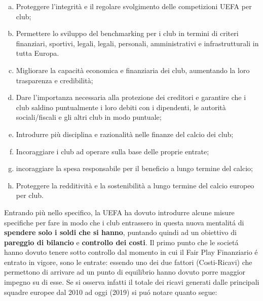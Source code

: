 \documentclass[
    corpo=12pt,
    oneside,
    evenboxes,
    tipotesi=triennale,
    stile=classica,
    oldstyle,
    autoretitolo,
    greek,
]{toptesi}
\begin{document}
\begin{interlinea}{1.5}
\begin{enumerate}[(a)]
    \item Proteggere l'integrità e il regolare svolgimento delle competizioni UEFA per club;
    \item Permettere lo sviluppo del benchmarking per i club in termini di criteri finanziari, sportivi, legali,
    legali, personali, amministrativi e infrastrutturali in tutta Europa.
    \item Migliorare la capacità economica e finanziaria dei club, aumentando la loro
    trasparenza e credibilità;
    \item Dare l'importanza necessaria alla protezione dei creditori e garantire
    che i club saldino puntualmente i loro debiti con i dipendenti, le autorità sociali/fiscali e gli altri
    club in modo puntuale;
    \item Introdurre più disciplina e razionalità nelle finanze del calcio dei club;
    \item Incoraggiare i club ad operare sulla base delle proprie entrate;
    \item incoraggiare la spesa responsabile per il beneficio a lungo termine del calcio;
    \item Proteggere la redditività e la sostenibilità a lungo termine del calcio europeo per club.
\end{enumerate}
Entrando più nello specifico, la UEFA ha dovuto introdurre alcune misure specifiche per fare in modo che i club entrassero in questa nuova 
mentalit\'a di \textbf{spendere solo i soldi che si hanno}, puntando quindi ad un obiettivo di \textbf{pareggio di bilancio} e \textbf{
controllo dei costi}. Il primo punto che le societ\'a hanno dovuto tenere sotto controllo dal momento in cui il Fair Play Finanziario \'e entrato in vigore, 
sono le entrate: essendo uno dei due fattori (Costi-Ricavi) che permettono di arrivare ad un punto di equilibrio hanno dovuto porre maggior impegno su di esse. 
Se si osserva infatti il totale dei ricavi generati dalle principali squadre europee dal 2010 ad oggi (2019) si pu\'o notare quanto segue:
\begin{figure}
    \centering
     \quad

\end{figure}
\end{interlinea}
\end{document}
